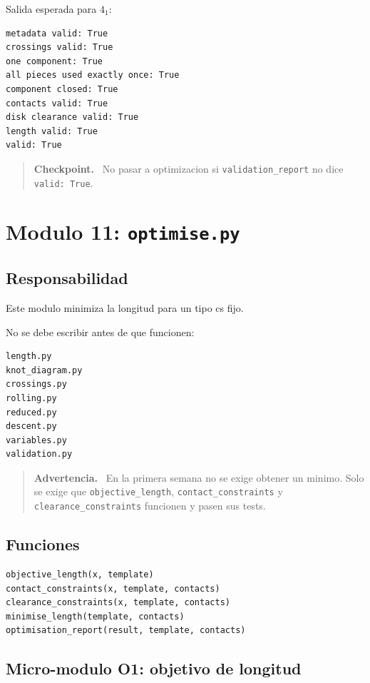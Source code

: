 \documentclass[11pt,letterpaper]{amsart}
\newenvironment{checkpoint}
{\par\medskip\noindent\begin{quote}\textbf{Checkpoint.}\ }
{\end{quote}\par\medskip}
\newenvironment{warningbox}
{\par\medskip\noindent\begin{quote}\textbf{Advertencia.}\ }
{\end{quote}\par\medskip}
\begin{document}
Salida esperada para \(4_1\):
\begin{verbatim}
metadata valid: True
crossings valid: True
one component: True
all pieces used exactly once: True
component closed: True
contacts valid: True
disk clearance valid: True
length valid: True
valid: True
\end{verbatim}

\begin{checkpoint}
No pasar a optimizacion si \texttt{validation\_report} no dice
\texttt{valid: True}.
\end{checkpoint}

\section{Modulo 11: \texttt{optimise.py}}

\subsection{Responsabilidad}

Este modulo minimiza la longitud para un tipo cs fijo.

No se debe escribir antes de que funcionen:

\begin{verbatim}
length.py
knot_diagram.py
crossings.py
rolling.py
reduced.py
descent.py
variables.py
validation.py
\end{verbatim}

\begin{warningbox}
En la primera semana no se exige obtener un minimo. Solo se exige que
\texttt{objective\_length}, \texttt{contact\_constraints} y
\texttt{clearance\_constraints} funcionen y pasen sus tests.
\end{warningbox}

\subsection{Funciones}

\begin{verbatim}
objective_length(x, template)
contact_constraints(x, template, contacts)
clearance_constraints(x, template, contacts)
minimise_length(template, contacts)
optimisation_report(result, template, contacts)
\end{verbatim}

\subsection{Micro-modulo O1: objetivo de longitud}
\end{document}
